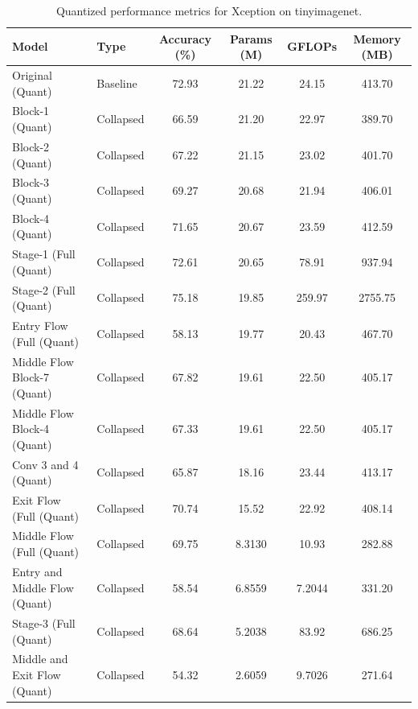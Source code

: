 \begin{table}
\caption{Quantized performance metrics for Xception on tinyimagenet.}
\label{tab:Xception_tinyimagenet_quant}
\begin{tabular}{llcccc}
\toprule
Model & Type & Accuracy (\%) & Params (M) & GFLOPs & Memory (MB) \\
\midrule
Original
(Quant) & Baseline & 72.93 & 21.22 & 24.15 & 413.70 \\
Block-1
(Quant) & Collapsed & 66.59 & 21.20 & 22.97 & 389.70 \\
Block-2
(Quant) & Collapsed & 67.22 & 21.15 & 23.02 & 401.70 \\
Block-3
(Quant) & Collapsed & 69.27 & 20.68 & 21.94 & 406.01 \\
Block-4
(Quant) & Collapsed & 71.65 & 20.67 & 23.59 & 412.59 \\
Stage-1 (Full
(Quant) & Collapsed & 72.61 & 20.65 & 78.91 & 937.94 \\
Stage-2 (Full
(Quant) & Collapsed & 75.18 & 19.85 & 259.97 & 2755.75 \\
Entry Flow (Full
(Quant) & Collapsed & 58.13 & 19.77 & 20.43 & 467.70 \\
Middle Flow Block-7
(Quant) & Collapsed & 67.82 & 19.61 & 22.50 & 405.17 \\
Middle Flow Block-4
(Quant) & Collapsed & 67.33 & 19.61 & 22.50 & 405.17 \\
Conv 3 and 4
(Quant) & Collapsed & 65.87 & 18.16 & 23.44 & 413.17 \\
Exit Flow (Full
(Quant) & Collapsed & 70.74 & 15.52 & 22.92 & 408.14 \\
Middle Flow (Full
(Quant) & Collapsed & 69.75 & 8.3130 & 10.93 & 282.88 \\
Entry and Middle Flow
(Quant) & Collapsed & 58.54 & 6.8559 & 7.2044 & 331.20 \\
Stage-3 (Full
(Quant) & Collapsed & 68.64 & 5.2038 & 83.92 & 686.25 \\
Middle and Exit Flow
(Quant) & Collapsed & 54.32 & 2.6059 & 9.7026 & 271.64 \\
\bottomrule
\end{tabular}
\end{table}

